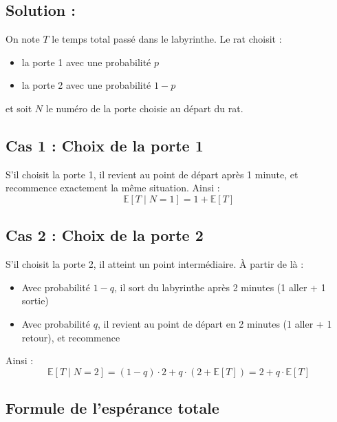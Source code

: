 \subsection*{Solution :}


On note \( T \) le temps total passé dans le labyrinthe. Le rat choisit :

\begin{itemize}
  \item la porte 1 avec une probabilité \( p \)
  \item la porte 2 avec une probabilité \( 1 - p \)
\end{itemize}

et soit $N$  le numéro de la porte choisie au départ du rat.
 

\subsection*{Cas 1 : Choix de la porte 1}

S'il choisit la porte 1, il revient au point de départ après 1 minute, et recommence exactement la même situation. Ainsi :
\[
\mathbb{E}[T \mid N = 1] = 1 + \mathbb{E}[T]
\]

\subsection*{Cas 2 : Choix de la porte 2}

S'il choisit la porte 2, il atteint un point intermédiaire. À partir de là :

\begin{itemize}
  \item Avec probabilité \( 1 - q \), il sort du labyrinthe après 2 minutes (1 aller + 1 sortie)
  \item Avec probabilité \( q \), il revient au point de départ en 2 minutes (1 aller + 1 retour), et recommence
\end{itemize}

Ainsi :
\[
\mathbb{E}[T \mid N = 2] = (1 - q) \cdot 2 + q \cdot (2 + \mathbb{E}[T]) = 2 + q \cdot \mathbb{E}[T]
\]

\subsection*{Formule de l'espérance totale}

